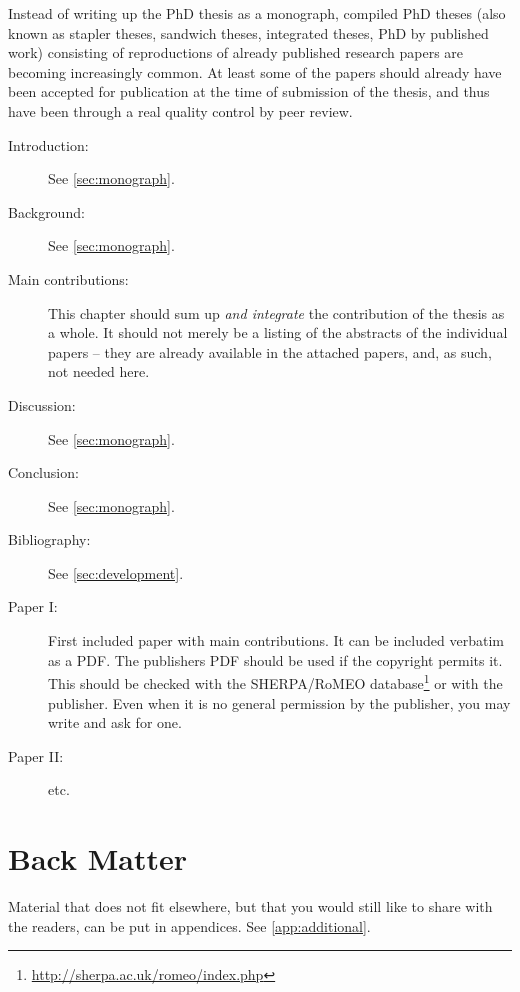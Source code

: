 Instead of writing up the PhD thesis as a monograph, compiled PhD theses (also known as stapler theses, sandwich theses, integrated theses, PhD by published work) consisting of reproductions of already published research papers are becoming increasingly common. At least some of the papers should already have been accepted for publication at the time of submission of the thesis, and thus have been through a real quality control by peer review.

\begin{description}
    \item[Introduction:] See \cref{sec:monograph}.
    \item[Background:] See \cref{sec:monograph}.
    \item[Main contributions:] This chapter should sum up \emph{and integrate} the contribution of the thesis as a whole. It should not merely be a listing of the abstracts of the individual papers – they are already available in the attached papers, and, as such, not needed here.
    \item[Discussion:] See \cref{sec:monograph}.
    \item[Conclusion:] See \cref{sec:monograph}.
    \item[Bibliography:] See \cref{sec:development}.
    \item[Paper I:] First included paper with main contributions. It can be included verbatim as a PDF. The publishers PDF should be used if the copyright permits it. This should be checked with the SHERPA/RoMEO database\footnote{\url{http://sherpa.ac.uk/romeo/index.php}} or with the publisher. Even when it is no general permission by the publisher, you may write and ask for one.
    \item[Paper II:] etc.
\end{description}

\section{Back Matter}

Material that does not fit elsewhere, but that you would still like to share with the readers, can be put in appendices. See \cref{app:additional}.
